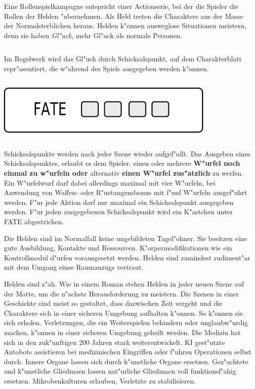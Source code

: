 
Eine Rollenspielkampagne entspricht einer Actionserie, bei der die Spieler die Rollen der Helden "ubernehmen. Als Held treten die Charaktere aus der Masse der Normalsterblichen heraus. Helden k"onnen ausweglose Situationen meistern, denn sie haben \emph{Gl"uck}, mehr Gl"uck als normale Personen. 

\begin{column}[l]{0.52}
    Im Regelwerk wird das Gl"uck durch Schicksalspunkt,  auf dem Charakterblatt repr"asentiert, die w"ahrend des Spiels ausgegeben werden k"onnen.
\end{column}
\begin{column}[r]{0.48}
    \centering
    \includegraphics[width=0.80\textwidth]{images/character_fate.png}    
\end{column}

Schicksalspunkte werden nach jeder Szene wieder aufgef"ullt. Das Ausgeben eines Schicksalspunktes, erlaubt es dem Spieler, einen oder mehrere \textbf{W"urfel noch einmal zu w"urfeln oder} alternativ \textbf{einen W"urfel zus"atzlich} zu werfen. Ein W"urfelwurf darf dabei allerdings maximal mit vier W"urfeln, bei Anwendung von Waffen- oder R"ustungensbonus mit f"unf W"urfeln ausgef"uhrt werden. F"ur jede Aktion darf nur maximal ein Schicksalspunkt ausgegeben werden. F"ur jeden ausgegebenen Schicksalspunkt wird ein K"astchen unter FATE abgestrichen.

Die Helden sind im Normalfall keine ungebildeten Tagel"ohner. Sie besitzen eine gute Ausbildung, Kontakte und Ressourcen. K"orpermodifikationen wie ein Kontrollmodul d"urfen vorausgesetzt werden. Helden sind zumindest rudiment"ar mit dem Umgang eines Raumanzugs vertraut.

Helden sind z"ah. Wie in einem Roman stehen Helden in jeder neuen Szene auf der Matte, um die n"achste Herausforderung zu meistern. Die Szenen in einer Geschichte sind meist so gestaltet, dass dazwischen Zeit vergeht und die Charaktere sich in einer sicheren Umgebung aufhalten k"onnen. So k"onnen sie sich erholen. Verletzungen, die ein Weiterspielen behindern oder unglaubw"urdig machen, k"onnen in einer sicheren Umgebung geheilt werden. Die Medizin hat sich in den zuk"unftigen 200 Jahren stark weiterentwickelt. KI gest"utzte Autobots assistieren bei medizinischen Eingriffen oder f"uhren Operationen selbst durch. Innere Organe lassen sich durch k"unstliche Organe ersetzen. Gez"uchtete und k"unstliche Gliedma\3en lassen nat"urliche Gliedma\3en voll funktionsf"ahig ersetzen. Mikrobenkulturen erlauben, Verletzte zu stabilisieren.
